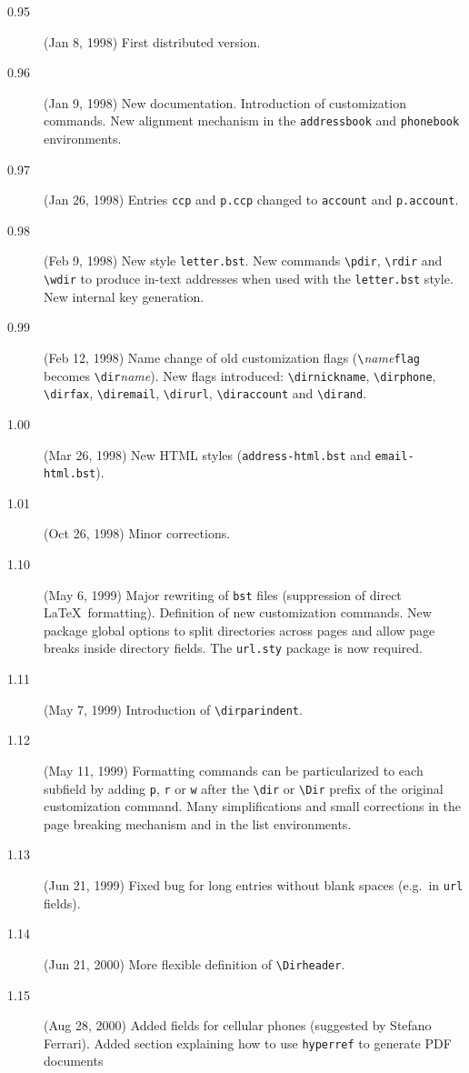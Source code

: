 \documentclass[10pt]{article}
\renewcommand{\Dirheader}[1]{\item\hspace{-\dirindent}\textbf{\MakeUppercase{#1}}}
\begin{document}
\begin{description}
\item[0.95] (Jan 8, 1998)
First distributed version. 
\item[0.96] (Jan 9, 1998)
New documentation. Introduction of customization commands. New alignment
mechanism in the \texttt{addressbook} and \texttt{phonebook} environments.  
\item[0.97] (Jan 26, 1998)
Entries \texttt{ccp} and \texttt{p.ccp} changed to \texttt{account} and
\texttt{p.account}.
\item[0.98] (Feb 9, 1998)
New style \texttt{letter.bst}. New commands \verb|\pdir|, \verb|\rdir| and
\verb|\wdir| to produce in-text addresses when used with the
\texttt{letter.bst} style. New internal key generation. 
\item[0.99] (Feb 12, 1998)
Name change of old customization flags (\verb'\'\emph{name}\verb'flag' becomes
\verb'\dir'\emph{name}). New flags introduced: \verb|\dirnickname|, \verb|\dirphone|,
\verb|\dirfax|, \verb|\diremail|, \verb|\dirurl|, \verb|\diraccount| and
\verb|\dirand|.
\item[1.00] (Mar 26, 1998)
New HTML styles (\texttt{address-html.bst} and \texttt{email-html.bst}). 
\item[1.01] (Oct 26, 1998)
Minor corrections.
\item[1.10] (May 6, 1999)
Major rewriting of \texttt{bst} files (suppression of direct \LaTeX\
formatting). Definition of new customization commands. New package global
options to split directories across pages and allow page breaks inside
directory fields. The \texttt{url.sty} package is now required. 
\item[1.11] (May 7, 1999)
Introduction of \verb'\dirparindent'. 
\item[1.12] (May 11, 1999)
Formatting commands can be particularized to each subfield by adding
\texttt{p}, \texttt{r} or \texttt{w} after the \verb'\dir' or \verb'\Dir'
prefix of the original customization command. Many simplifications and small
corrections in the page breaking mechanism and in the list environments.
\item[1.13] (Jun 21, 1999)
Fixed bug for long entries without blank spaces (e.g.\ in \texttt{url}
fields).
\item[1.14] (Jun 21, 2000)
More flexible definition of \verb|\Dirheader|.
\item[1.15] (Aug 28, 2000)
Added fields for cellular phones (suggested by Stefano Ferrari). Added
section explaining how to use \texttt{hyperref} to generate PDF documents

\end{description}
\end{document}
